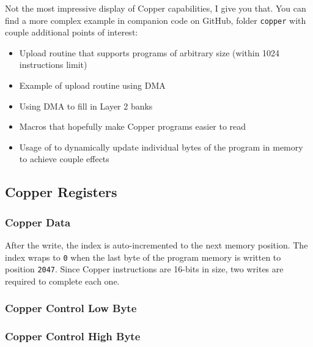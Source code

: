Not the most impressive display of Copper capabilities, I give you that. You can find a more complex example in companion code on GitHub, folder {\tt copper} with couple additional points of interest:

\begin{itemize}[topsep=1pt,itemsep=1pt]
	\item Upload routine that supports programs of arbitrary size (within 1024 instructions limit)
	\item Example of upload routine using DMA
	\item Using DMA to fill in Layer 2 banks
	\item Macros that hopefully make Copper programs easier to read
	\item Usage of  to dynamically update individual bytes of the program in memory to achieve couple effects
\end{itemize}


\pagebreak
\subsection{Copper Registers}
\label{zx_next_copper_registers}


\subsubsection{Copper Data }

\begin{NextPort}
\end{NextPort}

After the write, the index is auto-incremented to the next memory position. The index wraps to {\tt 0} when the last byte of the program memory is written to position {\tt 2047}. Since Copper instructions are 16-bits in size, two writes are required to complete each one.


\subsubsection{Copper Control Low Byte }

\begin{NextPort}
\end{NextPort}


\subsubsection{Copper Control High Byte }

